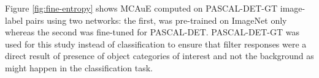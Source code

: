 Figure \ref{fig:fine-entropy} shows MCAuE computed on PASCAL-DET-GT image-label pairs using two networks: the first, was pre-trained on ImageNet only whereas the second was fine-tuned for PASCAL-DET. 
PASCAL-DET-GT was used for this study instead of classification to ensure that filter responses were a direct result of presence of object categories of interest and not the background as might happen in the classification task.

